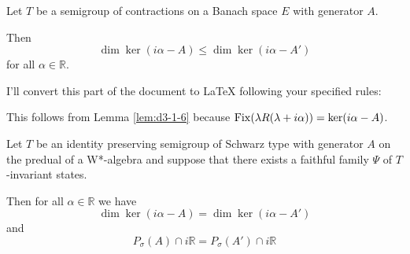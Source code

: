 \begin{corollary}\label{cor:d3-1-7}
Let $T$ be a semigroup of contractions on a Banach space $E$ with generator $A$.

Then
\[
\dim \ker(i\alpha - A) \leq \dim \ker(i\alpha - A')
\]
for all $\alpha \in \mathbb{R}$.
\end{corollary}


I'll convert this part of the document to LaTeX following your specified rules:

This follows from Lemma \ref{lem:d3-1-6} because $\mathrm{Fix}(\lambda R(\lambda+i\alpha)) = \ker(i\alpha-A)$.

\begin{proposition}\label{prop:d3-1-8}
Let $T$ be an identity preserving semigroup of Schwarz type with generator $A$ on the predual of a W*-algebra and suppose that there exists a faithful family $\Psi$ of $T$-invariant states.

Then for all $\alpha \in \mathbb{R}$ we have
\[
\dim \ker(i\alpha - A) = \dim \ker(i\alpha - A')
\]
and
\[
P_{\sigma}(A) \cap i\mathbb{R} = P_{\sigma}(A') \cap i\mathbb{R}
\]
\end{proposition}

